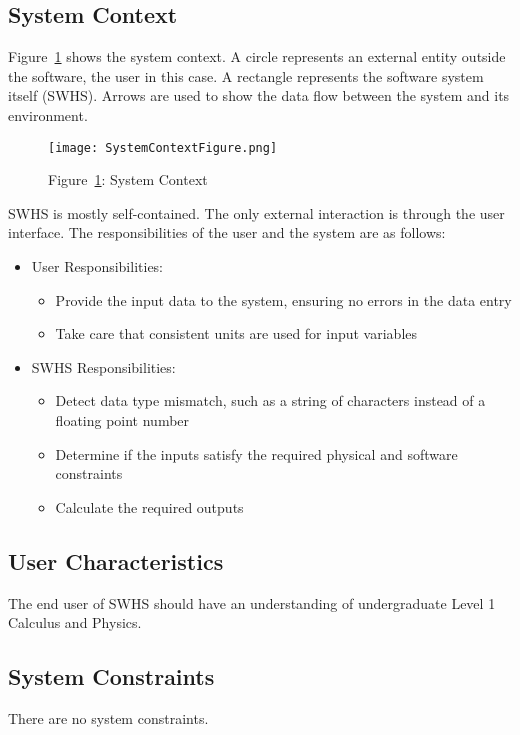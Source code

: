 \documentclass[12pt]{article}
\begin{document}
\subsection{System Context}
\label{Sec:SysContext}
Figure~\ref{Figure:SysCon} shows the system context. A circle represents an external entity outside the software, the user in this case. A rectangle represents the software system itself (SWHS). Arrows are used to show the data flow between the system and its environment.
\begin{figure}
\begin{center}
\texttt{[image: SystemContextFigure.png]}
\caption{Figure~\ref{Figure:SysCon}: System Context}
\label{Figure:SysCon}
\end{center}
\end{figure}
SWHS is mostly self-contained. The only external interaction is through the user interface. The responsibilities of the user and the system are as follows:
\begin{itemize}
\item{User Responsibilities:}
\begin{itemize}
\item{Provide the input data to the system, ensuring no errors in the data entry}
\item{Take care that consistent units are used for input variables}
\end{itemize}
\item{SWHS Responsibilities:}
\begin{itemize}
\item{Detect data type mismatch, such as a string of characters instead of a floating point number}
\item{Determine if the inputs satisfy the required physical and software constraints}
\item{Calculate the required outputs}
\end{itemize}
\end{itemize}
\subsection{User Characteristics}
\label{Sec:UserChars}
The end user of SWHS should have an understanding of undergraduate Level 1 Calculus and Physics.
\subsection{System Constraints}
\label{Sec:SysConstraints}
There are no system constraints.
\end{document}
